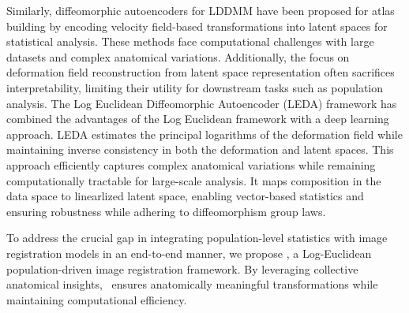 %
Similarly, diffeomorphic autoencoders for LDDMM \cite{hinkle2018diffeomorphic} have been proposed for atlas building by encoding velocity field-based transformations into latent spaces for statistical analysis. These methods face computational challenges with large datasets and complex anatomical variations. Additionally, the focus on deformation field reconstruction from latent space representation often sacrifices interpretability, limiting their utility for downstream tasks such as population analysis. The Log Euclidean Diffeomorphic Autoencoder (LEDA) \cite{iyer2024leda} framework has combined the advantages of the Log Euclidean framework with a deep learning approach. LEDA estimates the principal logarithms of the deformation field while maintaining inverse consistency in both the deformation and latent spaces. This approach efficiently captures complex anatomical variations while remaining computationally tractable for large-scale analysis. It maps composition in the data space to linearlized latent space, enabling vector-based statistics and ensuring robustness while adhering to diffeomorphism group laws.

To address the crucial gap in integrating population-level statistics with image registration models in an end-to-end manner, we propose \model, a Log-Euclidean population-driven image registration framework. By leveraging collective anatomical insights, \model~ensures anatomically meaningful transformations while maintaining computational efficiency. 

